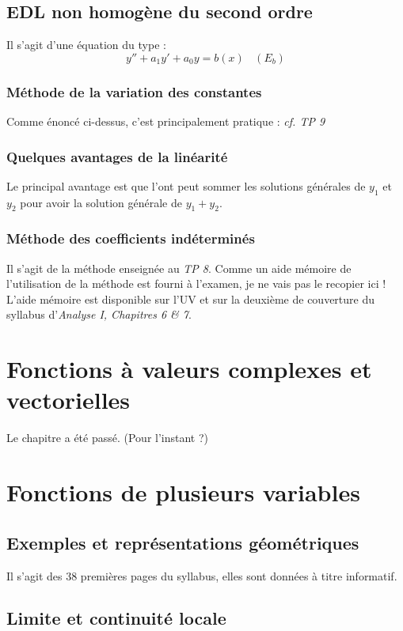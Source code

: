 \documentclass[11pt, a4paper, openany]{book}
\begin{document}
\section{EDL non homogène du second ordre}
Il s'agit d'une équation du type : 
$$y'' + a_1y' + a_0y = b(x)\ \ \ \  (E_b)$$

\subsection{Méthode de la variation des constantes}
Comme énoncé ci-dessus, c'est principalement pratique : \textit{cf. TP 9}

\subsection{Quelques avantages de la linéarité}
Le principal avantage est que l'ont peut sommer les solutions générales de $y_1$ et $y_2$ pour avoir la solution générale de $y_1 + y_2$.

\subsection{Méthode des coefficients indéterminés}
Il s'agit de la méthode enseignée au \textit{TP 8}. Comme un aide mémoire de l'utilisation de la méthode est fourni à l'examen, je ne vais pas le recopier ici ! \\
L'aide mémoire est disponible sur l'UV et sur la deuxième de couverture du syllabus d'\textit{Analyse I, Chapitres 6 \& 7}.

\chapter{Fonctions à valeurs complexes et vectorielles}
Le chapitre a été passé. (Pour l'instant ?)

\chapter{Fonctions de plusieurs variables}
\section{Exemples et représentations géométriques}
Il s'agit des 38 premières pages du syllabus, elles sont données à titre informatif.

\section{Limite et continuité locale}
\end{document}
